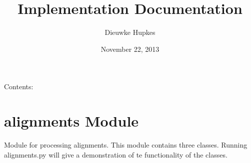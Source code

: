 \documentclass[letterpaper,10pt,english]{sphinxmanual}
\title{Implementation Documentation}
\date{November 22, 2013}
\author{Dieuwke Hupkes}
\begin{document}
\maketitle
\tableofcontents
{}\label{index::doc}


Contents:


\chapter{alignments Module}
\label{alignments:module-alignments}\label{alignments::doc}\label{alignments:welcome-to-implementation-s-documentation}\label{alignments:alignments-module}
Module for processing alignments. This module contains three classes. Running alignments.py
will give a demonstration of te functionality of the classes.
\end{document}
